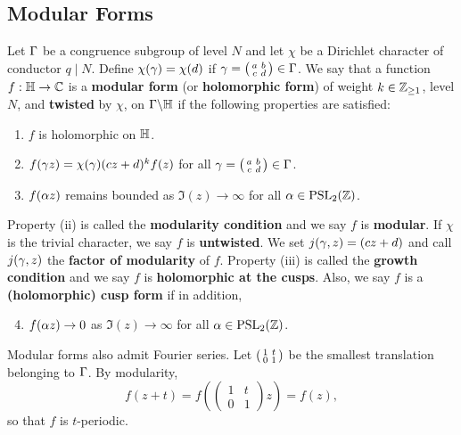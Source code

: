     \subsection*{Modular Forms}
      Let $\Gamma$ be a congruence subgroup of level $N$ and let $\chi$ be a Dirichlet character of conductor $q \mid N$. Define $\chi(\gamma) = \chi(d)$ if $\gamma = \begin{psmallmatrix} a & b \\ c & d \end{psmallmatrix} \in \Gamma$. We say that a function $f:\mathbb{H} \to \mathbb{C}$ is a \textbf{modular form} (or \textbf{holomorphic form}) of weight $k \in \mathbb{Z}_{\ge 1}$, level $N$, and \textbf{twisted} by $\chi$, on $\Gamma\backslash\mathbb{H}$ if the following properties are satisfied:
      \begin{enumerate}[label=(\roman*)]
        \item $f$ is holomorphic on $\mathbb{H}$.
        \item $f(\gamma z) = \chi(\gamma)(cz+d)^{k}f(z)$ for all $\gamma = \begin{psmallmatrix} a & b \\ c & d \end{psmallmatrix} \in \Gamma$.
        \item $f(\alpha z)$ remains bounded as $\Im(z) \to \infty$ for all $\alpha \in \mathrm{PSL}_{2}(\mathbb{Z})$.
      \end{enumerate}
      Property (ii) is called the \textbf{modularity condition} and we say $f$ is \textbf{modular}. If $\chi$ is the trivial character, we say $f$ is \textbf{untwisted}. We set $j(\gamma,z) = (cz+d)$ and call $j(\gamma,z)$ the \textbf{factor of modularity} of $f$. Property (iii) is called the \textbf{growth condition} and we say $f$ is \textbf{holomorphic at the cusps}. Also, we say $f$ is a \textbf{(holomorphic) cusp form} if in addition,
      \begin{enumerate}[label=(\roman*)]
        \setcounter{enumi}{3}
        \item $f(\alpha z) \to 0$ as $\Im(z) \to \infty$ for all $\alpha \in \mathrm{PSL}_{2}(\mathbb{Z})$.
      \end{enumerate}
      Modular forms also admit Fourier series. Let $\begin{psmallmatrix} 1 & t \\ 0 & 1 \end{psmallmatrix}$ be the smallest translation belonging to $\Gamma$. By modularity,
      \[
        f(z+t) = f\left(\begin{pmatrix} 1 & t \\ 0 & 1 \end{pmatrix}z\right) = f(z),
      \]
      so that $f$ is $t$-periodic.

